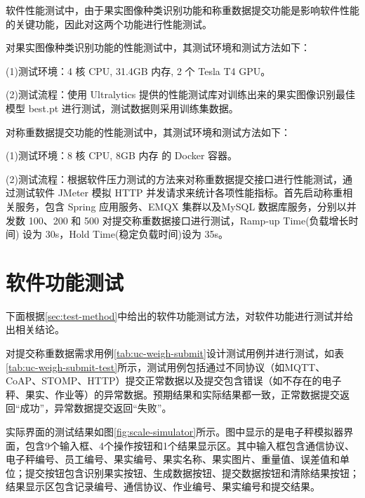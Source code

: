 软件性能测试中，由于果实图像种类识别功能和称重数据提交功能是影响软件性能的关键功能，因此对这两个功能进行性能测试。

对果实图像种类识别功能的性能测试中，其测试环境和测试方法如下：

(1)测试环境：4 核 CPU, 31.4GB 内存, 2 个 Tesla T4 GPU。

(2)测试流程：使用 Ultralytics 提供的性能测试库对训练出来的果实图像识别最佳模型 best.pt 进行测试，测试数据则采用训练集数据。

对称重数据提交功能的性能测试中，其测试环境和测试方法如下：

(1)测试环境：8 核 CPU, 8GB 内存 的 Docker 容器。

(2)测试流程：根据软件压力测试的方法\cite{Zhu2017}来对称重数据提交接口进行性能测试，通过测试软件 JMeter 模拟 HTTP 并发请求来统计各项性能指标。首先启动称重相关服务，包含 Spring 应用服务、EMQX 集群以及MySQL 数据库服务，分别以并发数 100、200 和 500 对提交称重数据接口进行测试，Ramp-up Time(负载增长时间) 设为 30s，Hold Time(稳定负载时间)设为 35s。

\section{软件功能测试}\label{sec:test-func}

下面根据\ref{sec:test-method}中给出的软件功能测试方法，对软件功能进行测试并给出相关结论。

对提交称重数据需求用例\ref{tab:uc-weigh-submit}设计测试用例并进行测试，如表\ref{tab:uc-weigh-submit-test}所示，测试用例包括通过不同协议（如MQTT、CoAP、STOMP、HTTP）提交正常数据以及提交包含错误（如不存在的电子秤、果实、作业等）的异常数据。预期结果和实际结果都一致，正常数据提交返回“成功”，异常数据提交返回“失败”。

实际界面的测试结果如图\ref{fig:scale-simulator}所示。图中显示的是电子秤模拟器界面，包含9个输入框、4个操作按钮和1个结果显示区。其中输入框包含通信协议、电子秤编号、员工编号、果实编号、果实名称、果实图片、重量值、误差值和单位；提交按钮包含识别果实按钮、生成数据按钮、提交数据按钮和清除结果按钮；结果显示区包含记录编号、通信协议、作业编号、果实编号和提交结果。

